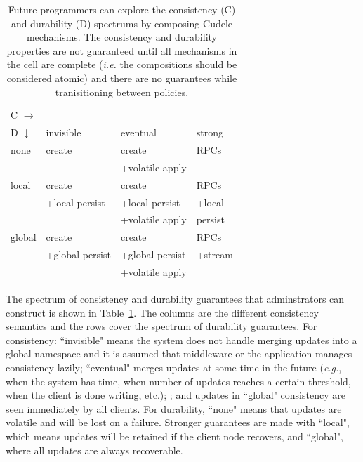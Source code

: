 \begin{table}[t]
\begin{center}
\caption{Future programmers can explore the consistency (C) and
durability (D) spectrums by composing Cudele mechanisms. The consistency
and durability properties are not guaranteed until all mechanisms in the cell
are complete ({\it i.e.} the compositions should be considered atomic) and there are
no guarantees while tranisitioning between policies. \label{table:spectrum}}
\begin{tabular}{ l | l | l | l }
  C \(\rightarrow\) &&& \\  
  D \(\downarrow\)  	     & invisible         & eventual        & strong  \\\hline
  none                       & create            & create          & RPCs    \\
                             &                   & +volatile apply &         \\\hdashline
  local                      & create            & create          & RPCs    \\
                             & +local persist    & +local persist  & +local  \\
                             &                   & +volatile apply &  persist\\\hdashline
  global                     & create            & create          & RPCs    \\
                             & +global persist   & +global persist & +stream \\
                             &                   & +volatile apply &         \\
\end{tabular}
\end{center}
\end{table}

The spectrum of consistency and durability guarantees that adminstrators can
construct is shown in Table~\ref{table:spectrum}. The columns are the different
consistency semantics and the rows cover the spectrum of durability guarantees.
For consistency: ``invisible" means the system does not handle merging updates
into a global namespace and it is assumed that middleware or the application
manages consistency lazily; ``eventual" merges updates at some time in the
future ({\it e.g.}, when the system has time, when number of updates reaches a
certain threshold, when the client is done writing, etc.); ; and updates in
``global" consistency are seen immediately by all clients. For durability,
``none" means that updates are volatile and will be lost on a failure. Stronger
guarantees are made with ``local", which means updates will be retained if the
client node recovers, and ``global", where all updates are always recoverable.


